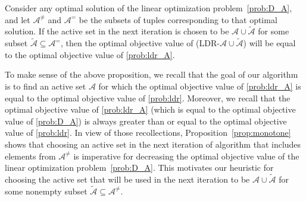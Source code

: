 \documentclass[nonblindrev,mnsc]{informs3} %
\begin{document}
\begin{proposition} \label{prop:monotone} 
Consider any optimal solution of the linear optimization problem~\eqref{prob:D_A}, and let $\mathcal{A}^{\neq}$ and $\mathcal{A}^=$ be the subsets of tuples corresponding to that optimal solution.  If the active set in the next iteration is chosen to be $\mathcal{A} \cup \widetilde{\mathcal{A}}$ for some subset $\widetilde{\mathcal{A}} \subseteq \mathcal{A}^=$, then the optimal objective value of \textnormal{(LDR-$\mathcal{A} \cup \widetilde{\mathcal{A}}$)} will be equal to the optimal objective value of \eqref{prob:ldr_A}. 
\end{proposition}
To make sense of the above proposition, we recall that the goal of our algorithm is to find an active set $\mathcal{A}$ for which the optimal objective value of \eqref{prob:ldr_A} is equal to the optimal objective value of \eqref{prob:ldr}. Moreover, we recall that the optimal objective value of \eqref{prob:ldr_A} (which is equal to the optimal objective value of \eqref{prob:D_A}) is always greater than or equal to the optimal objective value of \eqref{prob:ldr}. In view of those recollections, Proposition~\ref{prop:monotone} shows that choosing an active set in the next iteration of algorithm that includes elements from $\mathcal{A}^{\neq}$ is imperative for decreasing the optimal objective value of the linear optimization problem~\eqref{prob:D_A}.  This motivates our heuristic for choosing the active set that will be used in the next iteration to be  $\mathcal{A} \cup \widetilde{\mathcal{A}}$ for some nonempty subset $\widetilde{\mathcal{A}} \subseteq \mathcal{A}^{\neq}$.
\end{document}
